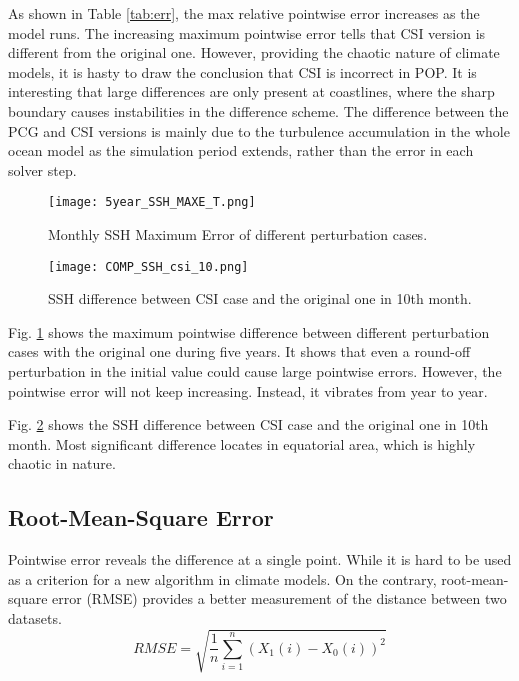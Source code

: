 \documentclass{sig-alternate}
\begin{document}
As shown in Table \ref{tab:err}, the max relative pointwise error increases as the model runs. The increasing maximum pointwise error tells that CSI version is different from the original one. However, providing the chaotic nature of climate models, it is hasty to draw the conclusion that CSI is incorrect in POP. 
It is interesting that large differences are only present at coastlines, where the sharp boundary causes instabilities in the difference scheme. The difference between the PCG and CSI versions is mainly due to the turbulence accumulation in the whole ocean model as the simulation period extends, rather than the error in each solver step.

\begin{figure}
\begin{center}
\texttt{[image: 5year\_SSH\_MAXE\_T.png]}
\end{center}
\caption[] {Monthly SSH Maximum Error of different perturbation cases.}
\label{fig:ssh_maxe_t}
\end{figure}

\begin{figure}
\begin{center}
\texttt{[image: COMP\_SSH\_csi\_10.png]}
\end{center}
\caption[] {SSH difference between CSI case and the original one in 10th month.}
\label{fig:ssh_comp_csi_10}
\end{figure}

Fig. \ref{fig:ssh_maxe_t} shows the maximum pointwise difference between different perturbation cases with the original one during five years.  It shows that even a round-off perturbation in the initial value could cause large pointwise errors. However, the pointwise error will not keep increasing. Instead, it vibrates from year to year. 

Fig. \ref{fig:ssh_comp_csi_10} shows the SSH difference between CSI case and the original one in 10th month. Most significant difference locates in equatorial area, which is highly chaotic in nature. 

\subsection{Root-Mean-Square Error}
Pointwise error reveals the difference at a single point. While it is hard to be used as a criterion for a new algorithm in climate models. On the contrary, root-mean-square error (RMSE) provides a better measurement of the distance between two datasets. 
$$RMSE = \sqrt{\frac{1}{n}\sum_{i=1}^n(X_1(i)-X_0(i))^2}$$
\end{document}

